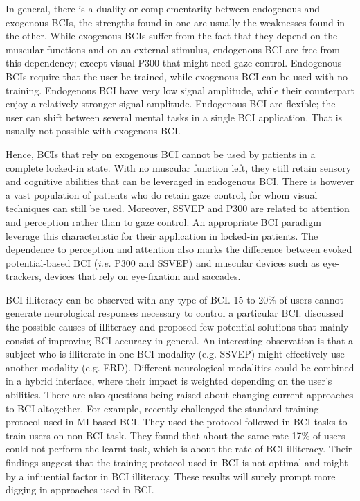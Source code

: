 In general, there is a duality or complementarity between endogenous and exogenous BCIs, the strengths found in one are usually the weaknesses found in the other.
While exogenous BCIs suffer from the fact that they depend on the muscular functions and on an external stimulus, endogenous BCI are free from this dependency; except visual P300 that might need gaze control.
Endogenous BCIs require that the user be trained, while exogenous BCI can be used with no training.
Endogenous BCI have very low signal amplitude, while their counterpart enjoy a relatively stronger signal amplitude.
Endogenous BCI are flexible; the user can shift between several mental tasks in a single BCI application. That is usually not possible with exogenous BCI.


Hence, BCIs that rely on exogenous BCI cannot be used by patients in a complete locked-in state. 
With no muscular function left, they still retain sensory and cognitive abilities that can be leveraged in endogenous BCI.
There is however a vast population of patients who do retain gaze control, for whom visual techniques can still be used. 
Moreover, SSVEP and P300 are related to attention and perception rather than to gaze control. 
An appropriate BCI paradigm leverage this characteristic for their application in locked-in patients.
The dependence to perception and attention also marks the difference between evoked potential-based BCI (\textit{i.e.} P300 and SSVEP) and muscular devices such as eye-trackers, devices that rely on eye-fixation and saccades. 

BCI illiteracy can be observed with any type of BCI.
15 to 20\% of users cannot generate neurological responses necessary to control a particular BCI.
\cite{allison_could_2010-1} discussed the possible causes of illiteracy and proposed few potential solutions that mainly consist of improving BCI accuracy in general. 
An interesting observation is that a subject who is illiterate in one BCI modality (e.g. SSVEP) might effectively use another modality (e.g. ERD). 
Different neurological modalities could be combined in a hybrid interface, where their impact is weighted depending on the user's abilities. 
There are also questions being raised about changing current approaches to BCI altogether.
For example, recently \cite{jeunet_why_2016} challenged the standard training protocol used in MI-based BCI. 
They used the protocol followed in BCI tasks to train users on non-BCI task. They found that about the same rate 17\% of users could not perform the learnt task, which is about the rate of BCI illiteracy. 
Their findings suggest that the training protocol used in BCI is not optimal and might by a influential factor in BCI illiteracy.
These results will surely prompt more digging in approaches used in BCI.

